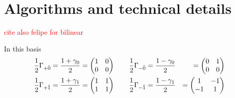 \chapter{Algorithms and technical details}
\label{chap:AppendixC}
\textcolor{red}{cite also felipe for bilinear}

In this basis 
\begin{equation*}
    \begin{aligned}
        \frac{1}{2}\Gamma_{+ \hat 0} = \frac{1 + \gamma_0}{2} &= 
        \begin{pmatrix}
            1 & 0 \\
            0 & 0    
        \end{pmatrix}
        \qquad 
        \frac{1}{2}\Gamma_{- \hat 0} = \frac{1 - \gamma_0}{2} &=
        \begin{pmatrix}
            0 & 1 \\
            0 & 0    
        \end{pmatrix} \\
        \frac{1}{2}\Gamma_{+ \hat 1} = \frac{1 + \gamma_1}{2} &=
        \begin{pmatrix}
            1 & 1 \\
            1 & 1    
        \end{pmatrix} 
        \qquad 
        \frac{1}{2}\Gamma_{- \hat 1} = \frac{1 - \gamma_1}{2} &=
        \begin{pmatrix}
            1 & -\vphantom{1}1 \\
            -\vphantom{1}1 & 1    
        \end{pmatrix}
    \end{aligned}
\end{equation*}
